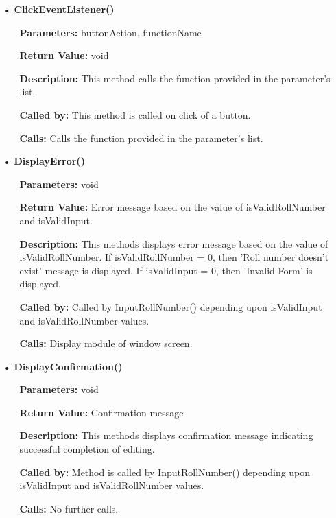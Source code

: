 \documentclass{scrreprt}
\begin{document}
\begin{enumerate}
\begin{itemize}
\end{itemize}
\begin{itemize}
\item [•] \textbf{ClickEventListener()}
\begin{itemize}
\item [] \textbf{Parameters:} buttonAction, functionName 
\item [] \textbf{Return Value:} void
\item [] \textbf{Description:} This method calls the function provided in the parameter's list.
\item [] \textbf{Called by:} This method is called on click of a button.
\item [] \textbf{Calls:} Calls the function provided in the parameter's list.  
\end{itemize}
\end{itemize}
\begin{itemize}
\item [•] \textbf{DisplayError()}
\begin{itemize}
\item [] \textbf{Parameters:} void 
\item [] \textbf{Return Value:} Error message based on the value of isValidRollNumber and isValidInput.
\item [] \textbf{Description:} This methods displays error message based on the value of isValidRollNumber. If isValidRollNumber = 0, then 'Roll number doesn't exist' message is displayed. If isValidInput = 0, then 'Invalid Form' is displayed.
\item [] \textbf{Called by:} Called by InputRollNumber() depending upon isValidInput and isValidRollNumber values.
\item [] \textbf{Calls:} Display module of window screen.
\end{itemize}
\end{itemize}
\begin{itemize}
\item [•] \textbf{DisplayConfirmation()}
\begin{itemize}
\item [] \textbf{Parameters:} void
\item [] \textbf{Return Value:} Confirmation message
\item [] \textbf{Description:} This methods displays confirmation message indicating successful completion of editing.
\item [] \textbf{Called by:} Method is called by InputRollNumber() depending upon isValidInput and isValidRollNumber values.
\item [] \textbf{Calls:} No further calls.
\end{itemize}
\end{itemize}
\end{enumerate}
\end{document}
